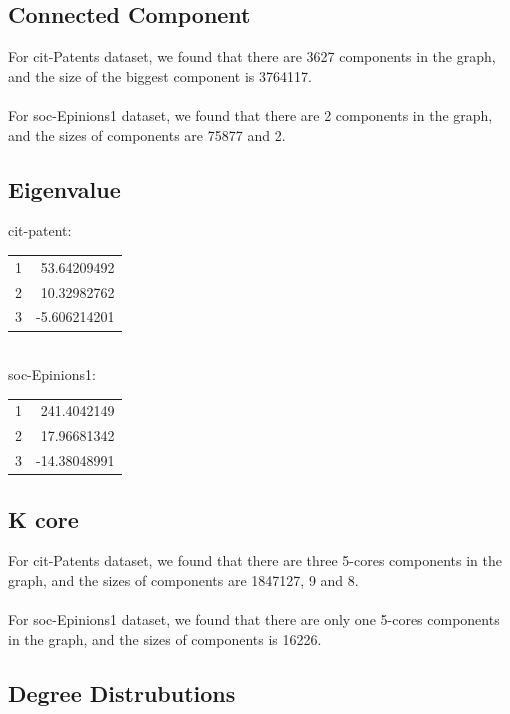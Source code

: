 \subsection{Connected Component}
For cit-Patents dataset, we found that there are 3627 components in the graph, and the size of the biggest component is 3764117. \\
\\
For soc-Epinions1 dataset, we found that there are 2 components in the graph, and the sizes of components are 75877 and 2. \\
\subsection{Eigenvalue}
cit-patent:\\
\begin{tabular}{ l r }
1 & 53.64209492\\
2 & 10.32982762\\
3 & -5.606214201\\
\end{tabular}
\\
soc-Epinions1:\\
\begin{tabular}{ l r }
1& 241.4042149\\
2 & 17.96681342\\
3 & -14.38048991\\
\end{tabular}
\subsection{K core}
For cit-Patents dataset, we found that there are three 5-cores components in the graph, and the sizes of components are 1847127, 9 and 8. \\
\\
For soc-Epinions1 dataset, we found that there are only one 5-cores components in the graph, and the sizes of components is 16226. \\
\subsection{Degree Distrubutions}

